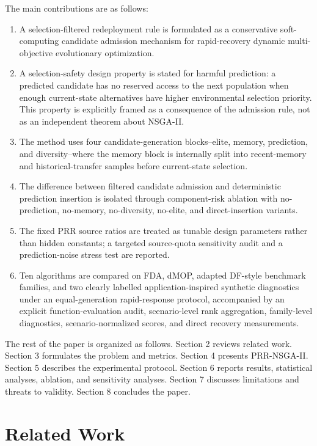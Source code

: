 \documentclass[1p,times]{elsarticle}
\begin{document}
The main contributions are as follows:
\begin{enumerate}[leftmargin=*]
\item A selection-filtered redeployment rule is formulated as a conservative soft-computing candidate admission mechanism for rapid-recovery dynamic multi-objective evolutionary optimization.
\item A selection-safety design property is stated for harmful prediction: a predicted candidate has no reserved access to the next population when enough current-state alternatives have higher environmental selection priority. This property is explicitly framed as a consequence of the admission rule, not as an independent theorem about NSGA-II.
\item The method uses four candidate-generation blocks--elite, memory, prediction, and diversity--where the memory block is internally split into recent-memory and historical-transfer samples before current-state selection.
\item The difference between filtered candidate admission and deterministic prediction insertion is isolated through component-risk ablation with no-prediction, no-memory, no-diversity, no-elite, and direct-insertion variants.
\item The fixed PRR source ratios are treated as tunable design parameters rather than hidden constants; a targeted source-quota sensitivity audit and a prediction-noise stress test are reported.
\item Ten algorithms are compared on FDA, dMOP, adapted DF-style benchmark families, and two clearly labelled application-inspired synthetic diagnostics under an equal-generation rapid-response protocol, accompanied by an explicit function-evaluation audit, scenario-level rank aggregation, family-level diagnostics, scenario-normalized scores, and direct recovery measurements.
\end{enumerate}

The rest of the paper is organized as follows. Section 2 reviews related work. Section 3 formulates the problem and metrics. Section 4 presents PRR-NSGA-II. Section 5 describes the experimental protocol. Section 6 reports results, statistical analyses, ablation, and sensitivity analyses. Section 7 discusses limitations and threats to validity. Section 8 concludes the paper.

\section{Related Work}
\end{document}
